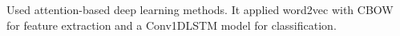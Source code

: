 Used attention-based deep learning methods. It applied word2vec with CBOW for feature extraction and a Conv1DLSTM model for classification.
